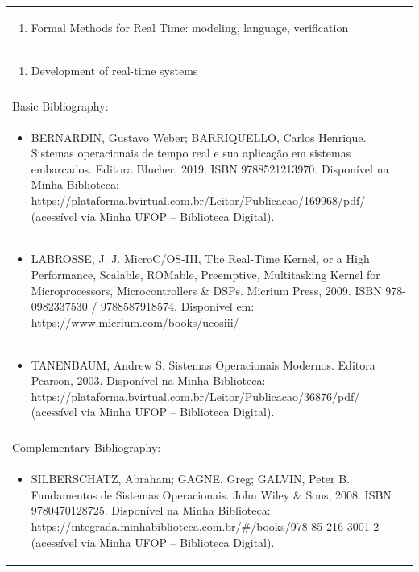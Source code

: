 \documentclass[11pt]{article}
\begin{document}
\begin{center}
\begin{longtable}{|p{4cm}|p{4cm}|p{4cm}|p{4cm}|}
\multicolumn{4}{|p{\dimexpr 16cm + 6\tabcolsep\relax}|}{\begin{enumerate}[start=9]\item Formal Methods for Real Time: modeling, language, verification\end{enumerate}}\\
\multicolumn{4}{|p{\dimexpr 16cm + 6\tabcolsep\relax}|}{\begin{enumerate}[start=10]\item Development of real-time systems\end{enumerate}}\\
\multicolumn{4}{|p{\dimexpr 16cm + 6\tabcolsep\relax}|}{}\\
\hline
\multicolumn{4}{|p{16cm}|}{Basic Bibliography:}\\*
\multicolumn{4}{|p{\dimexpr 16cm + 6\tabcolsep\relax}|}{\begin{itemize}\item BERNARDIN, Gustavo Weber; BARRIQUELLO, Carlos Henrique. Sistemas operacionais de tempo real e sua aplicação em sistemas embarcados. Editora Blucher, 2019. ISBN 9788521213970. Disponível na Minha Biblioteca: https://plataforma.bvirtual.com.br/Leitor/Publicacao/169968/pdf/ (acessível via Minha UFOP – Biblioteca Digital).\end{itemize}}\\
\multicolumn{4}{|p{\dimexpr 16cm + 6\tabcolsep\relax}|}{\begin{itemize}\item LABROSSE, J. J. MicroC/OS-III, The Real-Time Kernel, or a High Performance, Scalable, ROMable, Preemptive, Multitasking Kernel for Microprocessors, Microcontrollers \& DSPs. Micrium Press, 2009. ISBN 978-0982337530 / 9788587918574. Disponível em: https://www.micrium.com/books/ucosiii/\end{itemize}}\\
\multicolumn{4}{|p{\dimexpr 16cm + 6\tabcolsep\relax}|}{\begin{itemize}\item TANENBAUM, Andrew S. Sistemas Operacionais Modernos. Editora Pearson, 2003. Disponível na Minha Biblioteca: https://plataforma.bvirtual.com.br/Leitor/Publicacao/36876/pdf/ (acessível via Minha UFOP – Biblioteca Digital).\end{itemize}}\\
\multicolumn{4}{|p{16cm}|}{}\\
\hline
\multicolumn{4}{|p{16cm}|}{Complementary Bibliography:}\\*
\multicolumn{4}{|p{\dimexpr 16cm + 6\tabcolsep\relax}|}{\begin{itemize}\item SILBERSCHATZ, Abraham; GAGNE, Greg; GALVIN, Peter B. Fundamentos de Sistemas Operacionais. John Wiley \& Sons, 2008. ISBN 9780470128725. Disponível na Minha Biblioteca: https://integrada.minhabiblioteca.com.br/\#/books/978-85-216-3001-2 (acessível via Minha UFOP – Biblioteca Digital).\end{itemize}}\\

\end{longtable}
\end{center}
\end{document}
